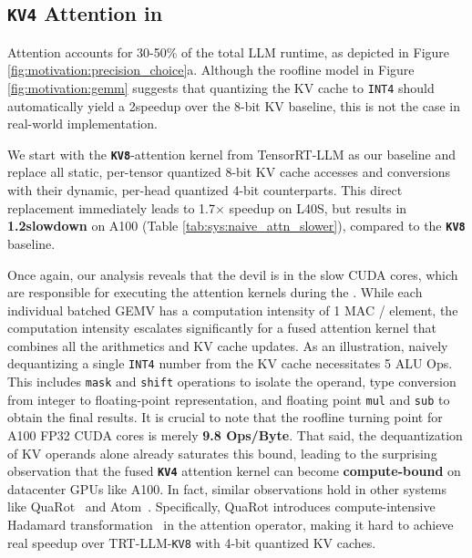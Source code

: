 \vspace{-8pt}
\subsection{\textbf{\texttt{KV4}} Attention in \system}
\label{sect:system:attention}



Attention accounts for 30-50\% of the total LLM runtime, as depicted in Figure \ref{fig:motivation:precision_choice}a. Although the roofline model in Figure \ref{fig:motivation:gemm} suggests that quantizing the KV cache to \texttt{INT4} should automatically yield a 2\x speedup over the 8-bit KV baseline, this is not the case in real-world implementation. 

We start with the \textbf{\texttt{KV8}}-attention \decodingstage kernel from TensorRT-LLM as our baseline and replace all static, per-tensor quantized 8-bit KV cache accesses and conversions with their dynamic, per-head quantized 4-bit counterparts. This direct replacement immediately leads to 1.7$\times$ speedup on L40S, but results in \textbf{1.2\x slowdown} on A100 (Table \ref{tab:sys:naive_attn_slower}), compared to the \textbf{\texttt{KV8}} baseline. 

Once again, our analysis reveals that the devil is in the slow CUDA cores, which are responsible for executing the attention kernels during the \decodingstage. While each individual batched GEMV has a computation intensity of 1 MAC / element, the computation intensity escalates significantly for a fused attention kernel that combines all the arithmetics and KV cache updates. As an illustration, naively dequantizing a single \texttt{INT4} number from the KV cache necessitates 5 ALU Ops. This includes \texttt{mask} and \texttt{shift} operations to isolate the operand, type conversion from integer to floating-point representation, and floating point \texttt{mul} and \texttt{sub} to obtain the final results. It is crucial to note that the roofline turning point for A100 FP32 CUDA cores is merely \textbf{9.8 Ops/Byte}. That said, the dequantization of KV  operands alone already saturates this bound, leading to the surprising observation that the fused \textbf{\texttt{KV4}} attention kernel can become \textbf{compute-bound} on datacenter GPUs like A100. In fact, similar observations hold in other systems like QuaRot~\cite{ashkboos2024quarot} and Atom~\cite{zhao2023atom}. Specifically, QuaRot introduces compute-intensive Hadamard transformation~\cite{quip} in the attention operator, making it hard to achieve real speedup over TRT-LLM-\texttt{KV8} with 4-bit quantized KV caches.


